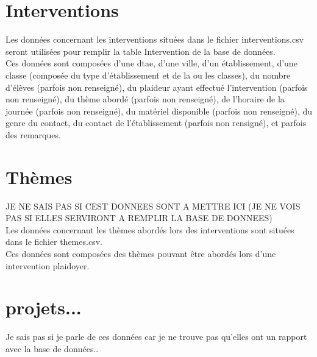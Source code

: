 \section{Interventions}
	Les données concernant les interventions situées dans le fichier interventions.csv seront utilisées pour remplir la table Intervention de la base de données. \\
	
	Ces données sont composées d'une dtae, d'une ville, d'un établissement, d'une classe (composée du type d'établissement et de la ou les classes), du nombre d'élèves (parfois non renseigné), du plaideur ayant effectué l'intervention (parfois non renseigné), du thème abordé (parfois non renseigné), de l'horaire de la journée (parfois non renseigné), du matériel disponible (parfois non renseigné), du genre du contact, du contact de l'établissement (parfois non rensigné), et parfois des remarques.
	
\section{Thèmes}
	JE NE SAIS PAS SI CEST DONNEES SONT A METTRE ICI (JE NE VOIS PAS SI ELLES SERVIRONT A REMPLIR LA BASE DE DONNEES) \\
	 
	Les données concernant les thèmes abordés lors des interventions sont situées dans le fichier themes.csv. \\
	
	Ces données sont composées des thèmes pouvant être abordés lors d'une intervention plaidoyer.
	
\section{projets...}
	Je sais pas si je parle de ces données car je ne trouve pas qu'elles ont un rapport avec la base de données..